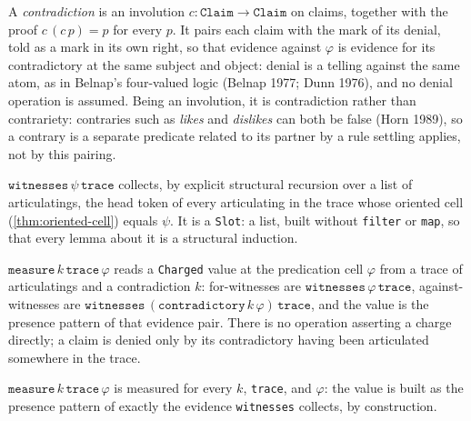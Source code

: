 \begin{definition}[Contradiction]\label{thm:contrary}\leanok{}
A \emph{contradiction} is an involution \(c : \texttt{Claim} \to
\texttt{Claim}\) on claims, together with the proof \(c\,(c\,p) = p\) for
every \(p\). It pairs each claim with the mark of its denial, told as a mark
in its own right, so that evidence against \(\varphi\) is evidence for its
contradictory at the same subject and object: denial is a telling against the
same atom, as in Belnap's four-valued logic (Belnap 1977; Dunn 1976), and no
denial operation is assumed. Being an involution, it is contradiction rather
than contrariety: contraries such as \emph{likes} and \emph{dislikes} can both
be false (Horn 1989), so a contrary is a separate predicate related to its
partner by a rule settling applies, not by this pairing.
\end{definition}

\begin{definition}\label{thm:witnesses}\leanok{}
\(\texttt{witnesses}\,\psi\,\texttt{trace}\) collects, by explicit structural
recursion over a list of articulatings, the head token of every articulating
in the trace whose oriented cell (\cref{thm:oriented-cell}) equals \(\psi\).
It is a \texttt{Slot}: a list, built without \texttt{filter} or \texttt{map},
so that every lemma about it is a structural induction.
\end{definition}

\begin{definition}\label{thm:trace-measure}\leanok{}
\(\texttt{measure}\,k\,\texttt{trace}\,\varphi\) reads a \texttt{Charged}
value at the predication cell \(\varphi\) from a trace of articulatings and a
contradiction \(k\): for-witnesses are \(\texttt{witnesses}\,\varphi\,
\texttt{trace}\), against-witnesses are
\(\texttt{witnesses}\,(\texttt{contradictory}\,k\,\varphi)\,\texttt{trace}\), and
the value is the presence pattern of that evidence pair. There is no
operation asserting a charge directly; a claim is denied only by its
contradictory having been articulated somewhere in the trace.
\end{definition}

\begin{theorem}\label{thm:measure-measured}\leanok{}
\(\texttt{measure}\,k\,\texttt{trace}\,\varphi\) is measured for every \(k\),
\texttt{trace}, and \(\varphi\): the value is built as the presence pattern
of exactly the evidence \texttt{witnesses} collects, by construction.
\end{theorem}

